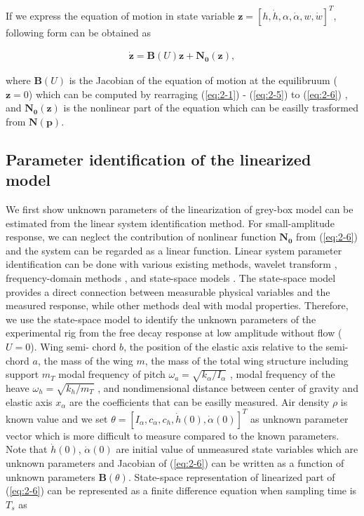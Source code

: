 \documentclass[openacc]{rsproca_new}%
\def\vec#1{\ensuremath{\mathbf{#1}}}
\newcommand{\Eref}[1]{(\ref{#1})}
\begin{document}
\noindent If we express the equation of motion in state variable $ \vec{z} = [h, \dot h, \alpha, \dot \alpha, w, \dot {w}] ^T $, following form can be obtained as

\begin{align}\label{eq:2-6}
\dot{\vec{z}}= \vec{B}(U)\vec{z}+\vec{N_0}(\vec{z}),
\end{align}

\noindent where $\vec{B}(U)$ is the Jacobian of the equation of motion at the equilibruum ($\vec z=0$) which can be computed by rearraging \Eref{eq:2-1} -  \Eref{eq:2-5} to \Eref{eq:2-6}
, and $\vec{N_0}(\vec{z})$ is the nonlinear part of the equation which can be easilly trasformed from $\vec{N}(\vec{p})$.


\subsection{Parameter identification of the linearized model}\label{linear}

We first show unknown parameters of the linearization of grey-box model can be estimated from the linear system identification method. For small-amplitude response, we can neglect the contribution of nonlinear function $\vec{N_0}$ from \Eref{eq:2-6} and the system can be regarded as a linear function. Linear system parameter identification can be done with various existing methods, wavelet transform \cite{ruzzene1997natural}, frequency-domain methods \cite{pintelon2012system}, and state-space models \cite{ljung2001system}. The state-space model provides a direct connection between measurable physical variables and the measured response, while other methods deal with modal properties. Therefore, we use the state-space model to identify the unknown parameters of the experimental rig from the free decay response at low amplitude without flow ($U=0$). Wing semi- chord $b$, the position of the elastic axis relative to the semi-chord $a$, the mass of the wing $m$, the mass of the total wing structure including support $m_T$
modal frequency of pitch $\omega_a=\sqrt{k_\alpha / I_\alpha}$ , modal frequency of the heave $\omega_h=\sqrt{k_h/m_T}$ , and nondimensional distance between center of gravity and elastic axis $x_\alpha$ are the coefficients that can be easilly measured.
Air density $\rho$ is known value and we set $\theta=[I_\alpha,c_\alpha,c_h,\dot h(0),\dot \alpha(0)]^T$ as unknown parameter vector which is more difficult to measure compared to the known parameters. Note that $\dot h(0)$, $\dot \alpha(0)$ are initial value of unmeasured state variables which are unknown parameters and Jacobian of \Eref{eq:2-6} can be written as a function of unknown parameters $\vec{B}(\theta)$. State-space representation of linearized part of \Eref{eq:2-6} can be represented as a finite difference equation when sampling time is $T_s$ as
\end{document}
